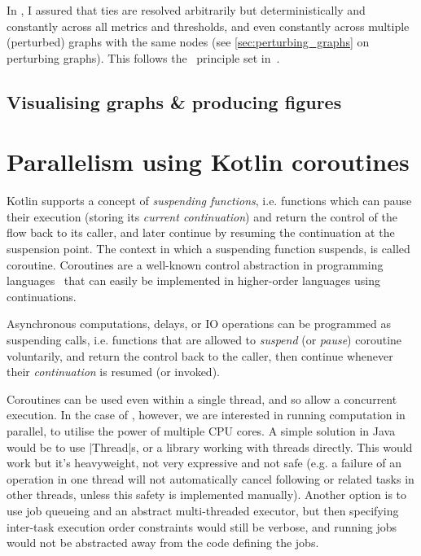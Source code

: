 In \graffs, I assured that ties are resolved arbitrarily but deterministically and constantly across all metrics and thresholds, and even constantly across multiple (perturbed) graphs with the same nodes (see \cref{sec:perturbing_graphs} on perturbing graphs).
This follows the~ principle set in~.

\subsection{Visualising graphs \& producing figures}



\section{Parallelism using Kotlin coroutines}
\label{sec:kotlin_coroutines}

Kotlin supports a concept of \textsl{suspending functions}, i.e. functions which can pause their execution (storing its \textsl{current continuation}) and return the control of the flow back to its caller, and later continue by resuming the continuation at the suspension point.
The context in which a suspending function suspends, is called coroutine.
Coroutines are a well-known control abstraction in programming languages~\cite{MouraRevisitingCoroutines2009} that can easily be implemented in higher-order languages using continuations\cite{HaynesContinuationsCoroutines1984}.

Asynchronous computations, delays, or IO operations can be programmed as suspending calls, i.e. functions that are allowed to \textsl{suspend} (or \textsl{pause}) coroutine voluntarily, and return the control back to the caller, then continue whenever their \textsl{continuation} is resumed (or invoked).

Coroutines can be used even within a single thread, and so allow a concurrent execution.
In the case of \graffs, however, we are interested in running computation in parallel, to utilise the power of multiple CPU cores.
A simple solution in Java would be to use |Thread|s, or a library working with threads directly.
This would work but it's heavyweight, not very expressive and not safe (e.g. a failure of an operation in one thread will not automatically cancel following or related tasks in other threads, unless this safety is implemented manually).
Another option is to use job queueing and an abstract multi-threaded executor, but then specifying inter-task execution order constraints would still be verbose, and running jobs would not be abstracted away from the code defining the jobs.

